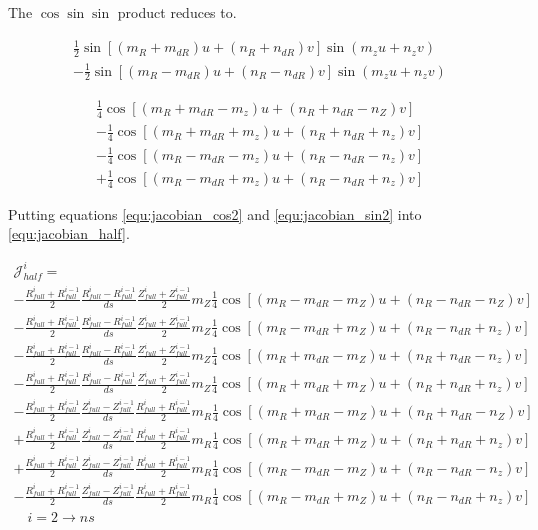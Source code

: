 \documentclass[11pt]{article}
\newcommand{\brackets}[1]{\left(#1\right)}
\newcommand{\sqbrackets}[1]{\left[#1\right]}
\newcommand{\equ}[2]{
	\begin{equation}
    \begin{split}
	#1
	\label{#2}
	\end{split}
	\end{equation}
}
\begin{document}
The $\cos\sin\sin$ product reduces to.
\equ{
\frac{1}{2}\sin\sqbrackets{\brackets{m_{R}+m_{dR}}u+\brackets{n_{R}+n_{dR}}v}\sin\brackets{m_{z}u+n_{z}v}\\
-\frac{1}{2}\sin\sqbrackets{\brackets{m_{R}-m_{dR}}u+\brackets{n_{R}-n_{dR}}v}\sin\brackets{m_{z}u+n_{z}v}
}{equ:jacobian_sin}
\equ{
\frac{1}{4}\cos\sqbrackets{\brackets{m_{R}+m_{dR}-m_{z}}u+\brackets{n_{R}+n_{dR}-n_{Z}}v}\\
-\frac{1}{4}\cos\sqbrackets{\brackets{m_{R}+m_{dR}+m_{z}}u+\brackets{n_{R}+n_{dR}+n_{z}}v}\\
-\frac{1}{4}\cos\sqbrackets{\brackets{m_{R}-m_{dR}-m_{z}}u+\brackets{n_{R}-n_{dR}-n_{z}}v}\\
+\frac{1}{4}\cos\sqbrackets{\brackets{m_{R}-m_{dR}+m_{z}}u+\brackets{n_{R}-n_{dR}+n_{z}}v}
}{equ:jacobian_sin2}

Putting equations \ref{equ:jacobian_cos2} and \ref{equ:jacobian_sin2} into \ref{equ:jacobian_half}.
\equ{
\mathcal{J}^{i}_{half}=\\
-\frac{R^{i}_{full}+R^{i-1}_{full}}{2}\frac{R^{i}_{full}-R^{i-1}_{full}}{ds}\frac{Z^{i}_{full}+Z^{i-1}_{full}}{2}m_{Z}\frac{1}{4}\cos\sqbrackets{\brackets{m_{R}-m_{dR}-m_{Z}}u+\brackets{n_{R}-n_{dR}-n_{Z}}v}\\
-\frac{R^{i}_{full}+R^{i-1}_{full}}{2}\frac{R^{i}_{full}-R^{i-1}_{full}}{ds}\frac{Z^{i}_{full}+Z^{i-1}_{full}}{2}m_{Z}\frac{1}{4}\cos\sqbrackets{\brackets{m_{R}-m_{dR}+m_{Z}}u+\brackets{n_{R}-n_{dR}+n_{z}}v}\\
-\frac{R^{i}_{full}+R^{i-1}_{full}}{2}\frac{R^{i}_{full}-R^{i-1}_{full}}{ds}\frac{Z^{i}_{full}+Z^{i-1}_{full}}{2}m_{Z}\frac{1}{4}\cos\sqbrackets{\brackets{m_{R}+m_{dR}-m_{Z}}u+\brackets{n_{R}+n_{dR}-n_{z}}v}\\
-\frac{R^{i}_{full}+R^{i-1}_{full}}{2}\frac{R^{i}_{full}-R^{i-1}_{full}}{ds}\frac{Z^{i}_{full}+Z^{i-1}_{full}}{2}m_{Z}\frac{1}{4}\cos\sqbrackets{\brackets{m_{R}+m_{dR}+m_{Z}}u+\brackets{n_{R}+n_{dR}+n_{z}}v}\\
-\frac{R^{i}_{full}+R^{i-1}_{full}}{2}\frac{Z^{i}_{full}-Z^{i-1}_{full}}{ds}\frac{R^{i}_{full}+R^{i-1}_{full}}{2}m_{R}\frac{1}{4}\cos\sqbrackets{\brackets{m_{R}+m_{dR}-m_{Z}}u+\brackets{n_{R}+n_{dR}-n_{Z}}v}\\
+\frac{R^{i}_{full}+R^{i-1}_{full}}{2}\frac{Z^{i}_{full}-Z^{i-1}_{full}}{ds}\frac{R^{i}_{full}+R^{i-1}_{full}}{2}m_{R}\frac{1}{4}\cos\sqbrackets{\brackets{m_{R}+m_{dR}+m_{Z}}u+\brackets{n_{R}+n_{dR}+n_{z}}v}\\
+\frac{R^{i}_{full}+R^{i-1}_{full}}{2}\frac{Z^{i}_{full}-Z^{i-1}_{full}}{ds}\frac{R^{i}_{full}+R^{i-1}_{full}}{2}m_{R}\frac{1}{4}\cos\sqbrackets{\brackets{m_{R}-m_{dR}-m_{Z}}u+\brackets{n_{R}-n_{dR}-n_{z}}v}\\
-\frac{R^{i}_{full}+R^{i-1}_{full}}{2}\frac{Z^{i}_{full}-Z^{i-1}_{full}}{ds}\frac{R^{i}_{full}+R^{i-1}_{full}}{2}m_{R}\frac{1}{4}\cos\sqbrackets{\brackets{m_{R}-m_{dR}+m_{Z}}u+\brackets{n_{R}-n_{dR}+n_{z}}v}\\
\quad i=2\rightarrow ns
}{equ:jacobian_half2}
\end{document}
